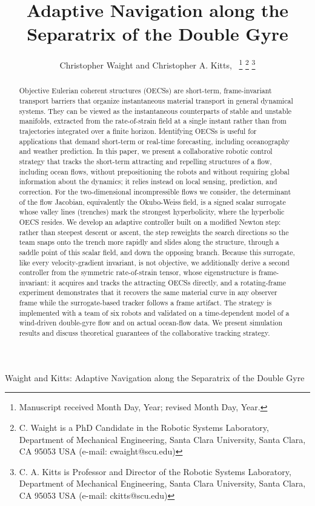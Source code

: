 \documentclass[lettersize,journal]{IEEEtran}
\begin{document}
\title{Adaptive Navigation along the Separatrix of the Double Gyre}

\author{Christopher Waight and Christopher A. Kitts,~
\thanks{Manuscript received Month Day, Year; revised Month Day, Year.}
\thanks{C. Waight is a PhD Candidate in the Robotic Systems Laboratory, Department of Mechanical
Engineering, Santa Clara University, Santa Clara, CA 95053 USA (e-mail: cwaight@scu.edu)}
\thanks{C. A. Kitts is Professor and Director of the Robotic Systems Laboratory, Department of
Mechanical Engineering, Santa Clara University, Santa Clara, CA 95053 USA (e-mail: ckitts@scu.edu)}
}
%
{Waight and Kitts: Adaptive Navigation along the Separatrix of the Double Gyre}

\maketitle

\begin{abstract}
Objective Eulerian coherent structures (OECSs) are short-term,
frame-invariant transport barriers that organize instantaneous material
transport in general dynamical systems. They can be viewed as the
instantaneous counterparts of stable and unstable manifolds, extracted
from the rate-of-strain field at a single instant rather than from
trajectories integrated over a finite horizon. Identifying OECSs is
useful for applications that demand short-term or real-time forecasting,
including oceanography and weather prediction. In this paper, we present
a collaborative robotic control strategy that tracks the short-term
attracting and repelling structures of a flow, including ocean flows,
without prepositioning the robots and without requiring global
information about the dynamics; it relies instead on local sensing,
prediction, and correction. For the two-dimensional incompressible flows
we consider, the determinant of the flow Jacobian, equivalently the
Okubo-Weiss field, is a signed scalar surrogate whose valley lines
(trenches) mark the strongest hyperbolicity, where the hyperbolic OECS
resides. We develop an adaptive controller built on a modified Newton
step: rather than steepest descent or ascent, the step reweights the
search directions so the team snaps onto the trench more rapidly and
slides along the structure, through a saddle point of this scalar
field, and down the opposing branch. Because this surrogate, like every
velocity-gradient invariant, is not objective, we additionally derive a
second controller from the symmetric rate-of-strain tensor, whose
eigenstructure is frame-invariant: it acquires and tracks the attracting
OECSs directly, and a rotating-frame experiment demonstrates that it
recovers the same material curve in any observer frame while the
surrogate-based tracker follows a frame artifact. The strategy is
implemented with a team of six robots and validated on a time-dependent
model of a wind-driven double-gyre flow and on actual ocean-flow data.
We present simulation results and discuss theoretical guarantees of the
collaborative tracking strategy.
\end{abstract}
\end{document}

